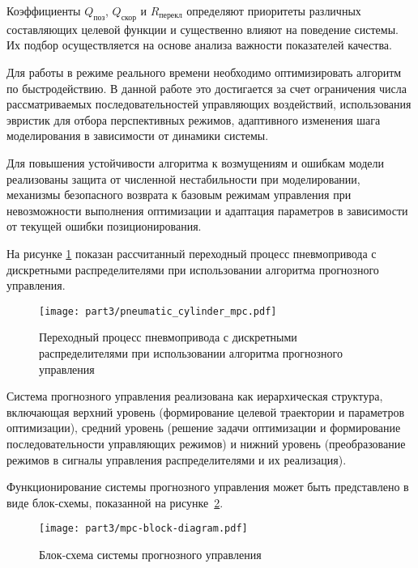 Коэффициенты $Q_{\text{поз}}$, $Q_{\text{скор}}$ и $R_{\text{перекл}}$ определяют приоритеты
различных составляющих целевой функции и существенно влияют на поведение системы. Их подбор
осуществляется на основе анализа важности показателей качества.

Для работы в режиме реального времени необходимо оптимизировать алгоритм по быстродействию.
В данной работе это достигается за счет ограничения числа рассматриваемых последовательностей
управляющих воздействий, использования эвристик для отбора перспективных режимов,
адаптивного изменения шага моделирования в зависимости от динамики системы.

Для повышения устойчивости алгоритма к возмущениям и ошибкам модели реализованы защита
от численной нестабильности при моделировании, механизмы безопасного возврата к базовым
режимам управления при невозможности выполнения оптимизации и адаптация параметров в зависимости от текущей ошибки позиционирования.

На рисунке \ref{fig:mpc_transient} показан рассчитанный переходный процесс
пневмопривода с дискретными распределителями при использовании алгоритма прогнозного управления.

\begin{figure}[ht]
	\centering
	\texttt{[image: part3/pneumatic\_cylinder\_mpc.pdf]}
	\caption{Переходный процесс пневмопривода с дискретными распределителями при использовании алгоритма прогнозного управления}
	\label{fig:mpc_transient}
\end{figure}

Система прогнозного управления реализована как иерархическая структура,
включающая верхний уровень (формирование целевой траектории и параметров оптимизации),
средний уровень (решение задачи оптимизации и формирование последовательности управляющих режимов) и
нижний уровень (преобразование режимов в сигналы управления распределителями и их реализация).

Функционирование системы прогнозного управления может быть представлено
в виде блок-схемы, показанной на рисунке~\ref{fig:mpc_block_diagram}.

\begin{figure}[ht]
	\centering
	\texttt{[image: part3/mpc-block-diagram.pdf]}
	\caption{Блок-схема системы прогнозного управления}
	\label{fig:mpc_block_diagram}
\end{figure}

